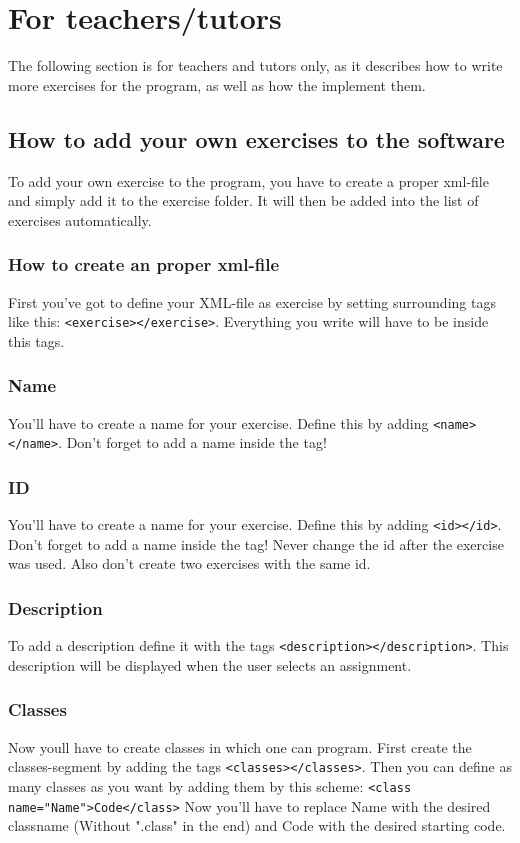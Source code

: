 \documentclass[10pt,a4paper]{article}
\begin{document}
\section{For teachers/tutors}
The following section is for teachers and tutors only, as it describes how to write more exercises for the program, as well as how the implement them.
\subsection{How to add your own exercises to the software}
To add your own exercise to the program, you have to create a proper xml-file and simply add it to the exercise folder. It will then be added into the list of exercises automatically.
\subsubsection{How to create an proper xml-file}
First you've got to define your XML-file as exercise by setting surrounding tags like this: 
\texttt{<exercise></exercise>}. Everything you write will have to be inside this tags.
\subsubsection{Name}
You'll have to create a name for your exercise. Define this by adding \texttt{<name></name>}. Don't forget to add a name inside the tag!
\subsubsection{ID}
You'll have to create a name for your exercise. Define this by adding \texttt{<id></id>}. Don't forget to add a name inside the tag! Never change the id  after the exercise was used. Also don't create two exercises with the same id.
\subsubsection{Description}
To add a description define it with the tags \texttt{<description></description>}. This description will be displayed when the user selects an assignment.
\subsubsection{Classes}
Now youll have to create classes in which one can program. First create the classes-segment by adding the tags \texttt{<classes></classes>}. \newline
Then you can define as many classes as you want by adding them by this scheme: \newline
\texttt{<class name="Name">Code</class>} Now you'll have to replace Name with the desired classname (Without ".class" in the end) and Code with the desired starting code.
\end{document}
